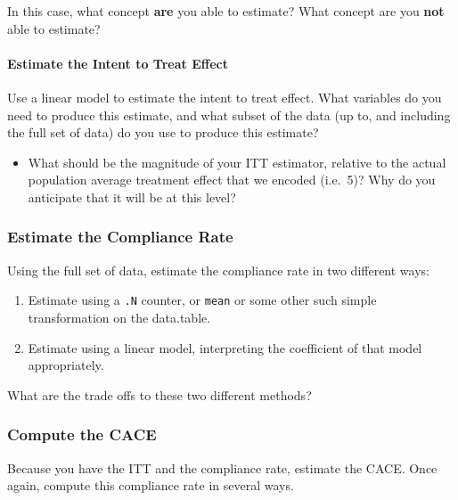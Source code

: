 \documentclass[
]{article}
\providecommand{\tightlist}{%
  \setlength{\itemsep}{0pt}\setlength{\parskip}{0pt}}
\begin{document}
In this case, what concept \textbf{are} you able to estimate? What concept are you \textbf{not} able to estimate?

\hypertarget{estimate-the-intent-to-treat-effect}{%
\paragraph{Estimate the Intent to Treat Effect}\label{estimate-the-intent-to-treat-effect}}

Use a linear model to estimate the intent to treat effect. What variables do you need to produce this estimate, and what subset of the data (up to, and including the full set of data) do you use to produce this estimate?

\begin{itemize}
\tightlist
\item
  What should be the magnitude of your ITT estimator, relative to the actual population average treatment effect that we encoded (i.e.~5)? Why do you anticipate that it will be at this level?
\end{itemize}

\hypertarget{estimate-the-compliance-rate}{%
\subsubsection{Estimate the Compliance Rate}\label{estimate-the-compliance-rate}}

Using the full set of data, estimate the compliance rate in two different ways:

\begin{enumerate}
\def\labelenumi{\arabic{enumi}.}
\tightlist
\item
  Estimate using a \texttt{.N} counter, or \texttt{mean} or some other such simple transformation on the data.table.
\item
  Estimate using a linear model, interpreting the coefficient of that model appropriately.
\end{enumerate}

What are the trade offs to these two different methods?

\hypertarget{compute-the-cace}{%
\subsubsection{Compute the CACE}\label{compute-the-cace}}

Because you have the ITT and the compliance rate, estimate the CACE. Once again, compute this compliance rate in several ways.
\end{document}
